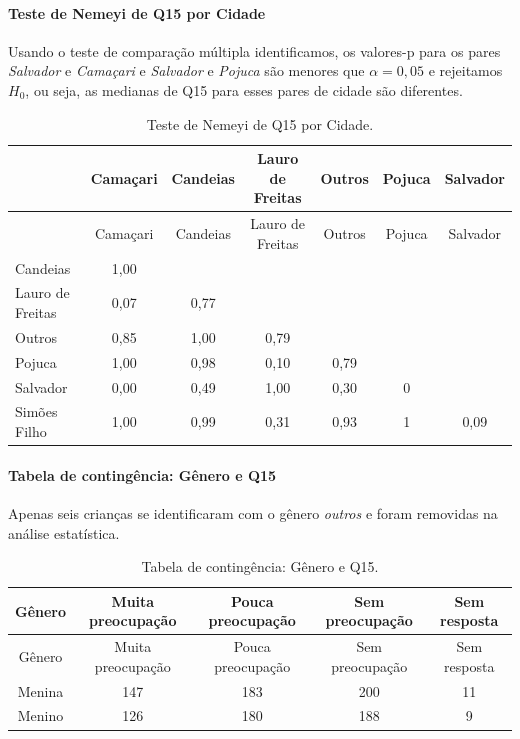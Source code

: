\documentclass[]{article}
\let\oldparagraph\paragraph
\renewcommand{\paragraph}[1]{\oldparagraph{#1}\mbox{}}
\begin{document}
\hypertarget{teste-de-nemeyi-de-q15-por-cidade}{%
\paragraph{Teste de Nemeyi de Q15 por Cidade}\label{teste-de-nemeyi-de-q15-por-cidade}}

Usando o teste de comparação múltipla identificamos, os valores-p para os pares \emph{Salvador} e \emph{Camaçari} e \emph{Salvador} e \emph{Pojuca} são menores que \(\alpha=0,05\) e rejeitamos \(H_0\), ou seja, as medianas de Q15 para esses pares de cidade são diferentes.

\begin{longtable}[]{@{}lcccccc@{}}
\caption{\label{tab:unnamed-chunk-104}Teste de Nemeyi de Q15 por Cidade.}\tabularnewline
\toprule
& Camaçari & Candeias & Lauro de Freitas & Outros & Pojuca & Salvador\tabularnewline
\midrule
\endfirsthead
\toprule
& Camaçari & Candeias & Lauro de Freitas & Outros & Pojuca & Salvador\tabularnewline
\midrule
\endhead
Candeias & 1,00 & & & & &\tabularnewline
Lauro de Freitas & 0,07 & 0,77 & & & &\tabularnewline
Outros & 0,85 & 1,00 & 0,79 & & &\tabularnewline
Pojuca & 1,00 & 0,98 & 0,10 & 0,79 & &\tabularnewline
Salvador & 0,00 & 0,49 & 1,00 & 0,30 & 0 &\tabularnewline
Simões Filho & 1,00 & 0,99 & 0,31 & 0,93 & 1 & 0,09\tabularnewline
\bottomrule
\end{longtable}

\cleardoublepage

\hypertarget{tabela-de-continguxeancia-guxeanero-e-q15}{%
\paragraph{Tabela de contingência: Gênero e Q15}\label{tabela-de-continguxeancia-guxeanero-e-q15}}

Apenas seis crianças se identificaram com o gênero \emph{outros} e foram removidas na análise estatística.

\begin{longtable}[]{@{}ccccc@{}}
\caption{\label{tab:unnamed-chunk-105}Tabela de contingência: Gênero e Q15.}\tabularnewline
\toprule
Gênero & Muita preocupação & Pouca preocupação & Sem preocupação & Sem resposta\tabularnewline
\midrule
\endfirsthead
\toprule
Gênero & Muita preocupação & Pouca preocupação & Sem preocupação & Sem resposta\tabularnewline
\midrule
\endhead
Menina & 147 & 183 & 200 & 11\tabularnewline
Menino & 126 & 180 & 188 & 9\tabularnewline
\bottomrule
\end{longtable}
\end{document}
